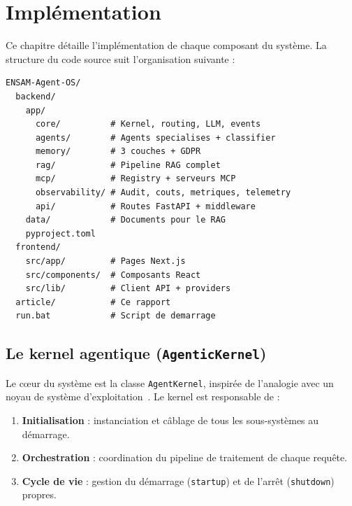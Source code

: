 \documentclass[12pt, a4paper]{article}
\begin{document}
\section{Implémentation}
\label{chap:implementation}

Ce chapitre détaille l'implémentation de chaque composant du système. La structure du code source suit l'organisation suivante :

\begin{lstlisting}[style=jsonstyle, caption={Structure du dépôt de code}, label={lst:structure}]
ENSAM-Agent-OS/
  backend/
    app/
      core/          # Kernel, routing, LLM, events
      agents/        # Agents specialises + classifier
      memory/        # 3 couches + GDPR
      rag/           # Pipeline RAG complet
      mcp/           # Registry + serveurs MCP
      observability/ # Audit, couts, metriques, telemetry
      api/           # Routes FastAPI + middleware
    data/            # Documents pour le RAG
    pyproject.toml
  frontend/
    src/app/         # Pages Next.js
    src/components/  # Composants React
    src/lib/         # Client API + providers
  article/           # Ce rapport
  run.bat            # Script de demarrage
\end{lstlisting}

\subsection{Le kernel agentique (\texttt{AgenticKernel})}

Le c\oe{}ur du système est la classe \texttt{AgentKernel}, inspirée de l'analogie avec un noyau de système d'exploitation~\cite{packer2023memgpt}. Le kernel est responsable de :

\begin{enumerate}
  \item \textbf{Initialisation} : instanciation et câblage de tous les sous-systèmes au démarrage.
  \item \textbf{Orchestration} : coordination du pipeline de traitement de chaque requête.
  \item \textbf{Cycle de vie} : gestion du démarrage (\texttt{startup}) et de l'arrêt (\texttt{shutdown}) propres.
\end{enumerate}
\end{document}
